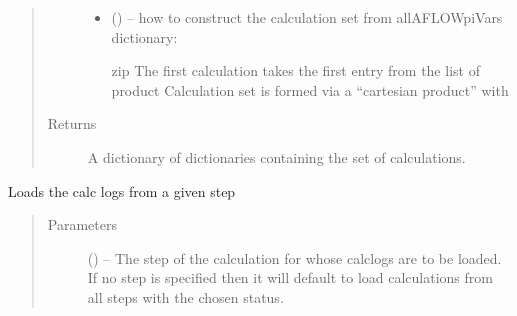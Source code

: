 \documentclass[letterpaper,10pt,english]{sphinxmanual}
\begin{document}
\begin{fulllineitems}
\begin{fulllineitems}
\begin{quote}
\begin{description}
\begin{itemize}
\item {} 
 () -- 
how to construct the calculation set from allAFLOWpiVars dictionary:
\begin{description}
\item[{zip \textbar{} The first calculation takes the first entry from the list of}] \leavevmode
{}

\item[{product \textbar{} Calculation set is formed via a ``cartesian product'' with}] \leavevmode
{}

\end{description}


\end{itemize}

\item[{Returns}] \leavevmode
A dictionary of dictionaries containing the set of calculations.

\end{description}\end{quote}

\end{fulllineitems}


\begin{fulllineitems}
\label{\detokenize{prep:prep.init.status}}
Loads the calc logs from a given step
\begin{quote}\begin{description}
\item[{Parameters}] \leavevmode
{} () -- The step of the calculation for whose calclogs are to be loaded.
If no step is specified then it will default to load calculations
from all steps with the chosen status.


\end{description}
\end{quote}
\end{fulllineitems}
\end{fulllineitems}
\end{document}
